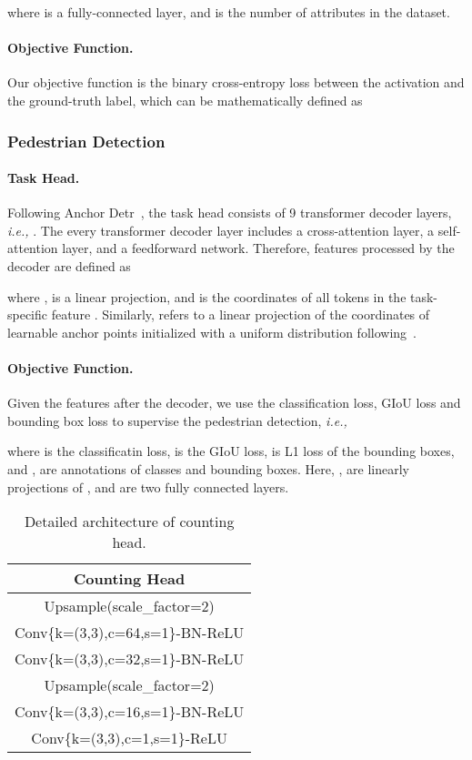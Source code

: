 \documentclass[10pt,twocolumn,letterpaper]{article}
\begin{document}
where   is a fully-connected layer, and  is the number of attributes in the dataset. 
\paragraph{Objective Function.} Our objective function is the binary cross-entropy loss between the activation and the ground-truth label, which can be mathematically defined as


\subsubsection{Pedestrian Detection}
\paragraph{Task Head.} Following Anchor Detr~\cite{wang2022anchor}, the task head consists of 9 transformer decoder layers, \emph{i.e.,} . The every transformer decoder layer  includes a cross-attention layer, a self-attention layer, and a feedforward network. Therefore, features processed by the decoder  are defined as

where ,  is a linear projection, and  is the coordinates of all tokens in the task-specific feature . Similarly,  refers to a linear projection of the coordinates of learnable anchor points initialized with a uniform distribution following~\cite{wang2022anchor}. 

\paragraph{Objective Function.} Given the features  after the decoder, we use the classification loss, GIoU loss and bounding box loss to supervise the pedestrian detection, \emph{i.e.,}


where  is the classificatin loss,  is the GIoU loss,  is L1 loss of the bounding boxes, and ,  are annotations of classes and bounding boxes. Here, ,   are linearly projections of ,  and  are two fully connected layers.




\begin{table}[t]
	\centering
	
	\begin{tabular}{c}
        \hline
        \textbf{Counting Head } \\
           \hline
         Upsample(scale\_factor=2)                     \\
         Conv\{k=(3,3),c=64,s=1\}-BN-ReLU                  \\
          Conv\{k=(3,3),c=32,s=1\}-BN-ReLU                   \\
        Upsample(scale\_factor=2)              \\
         Conv\{k=(3,3),c=16,s=1\}-BN-ReLU                \\
         Conv\{k=(3,3),c=1,s=1\}-ReLU \\
       \hline

	\end{tabular}
	\caption{Detailed architecture of counting head.}
	\label{Table:CP1}
\end{table}
\end{document}
